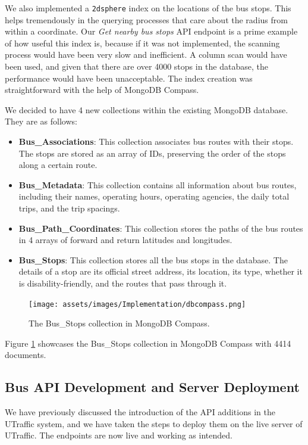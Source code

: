 We also implemented a \lstinline{2dsphere} index on the locations of the bus stops. This helps tremendously in the querying processes that care about the radius from within a coordinate. Our \textit{Get nearby bus stops} API endpoint is a prime example of how useful this index is, because if it was not implemented, the scanning process would have been very slow and inefficient. A column scan would have been used, and given that there are over 4000 stops in the database, the performance would have been unacceptable. The index creation was straightforward with the help of MongoDB Compass.

We decided to have 4 new collections within the existing MongoDB database. They are as follows:
\begin{itemize}
    \item \textbf{Bus\_Associations}: This collection associates bus routes with their stops. The stops are stored as an array of IDs, preserving the order of the stops along a certain route.
    \item \textbf{Bus\_Metadata}: This collection contains all information about bus routes, including their names, operating hours, operating agencies, the daily total trips, and the trip spacings.
    \item \textbf{Bus\_Path\_Coordinates}: This collection stores the paths of the bus routes in 4 arrays of forward and return latitudes and longitudes.
    \item \textbf{Bus\_Stops}: This collection stores all the bus stops in the database. The details of a stop are its official street address, its location, its type, whether it is disability-friendly, and the routes that pass through it.
\end{itemize}
\begin{figure}
    \centering
    \texttt{[image: assets/images/Implementation/dbcompass.png]}
    \caption{The Bus\_Stops collection in MongoDB Compass.}
    \label{fig:dbcompass}
\end{figure}
Figure \ref{fig:dbcompass} showcases the Bus\_Stops collection in MongoDB Compass with 4414 documents.

\subsection{Bus API Development and Server Deployment}
We have previously discussed the introduction of the API additions in the UTraffic system, and we have taken the steps to deploy them on the live server of UTraffic. The endpoints are now live and working as intended.
